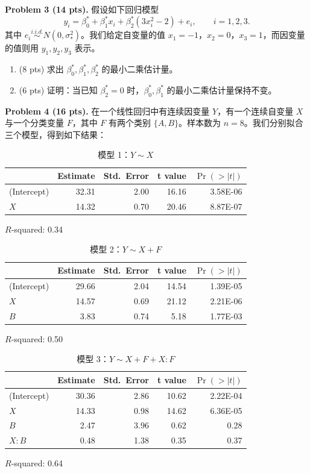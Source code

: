 \documentclass[11pt]{ctexart}
\begin{document}
\noindent\textbf{Problem 3 (14 pts).} 假设如下回归模型
\[
y_i = \beta_0^* + \beta_1^* x_i + \beta_2^* \left(3x_i^2 - 2\right) + e_i, \qquad i = 1, 2, 3.
\]
其中 $e_i \stackrel{i.i.d.}{\sim} N(0, \sigma_*^2)$。我们给定自变量的值 $x_1 = -1$，$x_2 = 0$，$x_3 = 1$，而因变量的值则用 $y_1, y_2, y_3$ 表示。
\begin{enumerate}
\item (8 pts) 求出 $\beta_0^*, \beta_1^*, \beta_2^*$ 的最小二乘估计量。
\item (6 pts) 证明：当已知 $\beta_2^* = 0$ 时，$\beta_0^*, \beta_1^*$ 的最小二乘估计量保持不变。
\end{enumerate}

\noindent\textbf{Problem 4 (16 pts).} 在一个线性回归中有连续因变量 $Y$，有一个连续自变量 $X$ 与一个分类变量 $F$，其中 $F$ 有两个类别 $\{A, B\}$。样本数为 $n = 8$。我们分别拟合三个模型，得到如下结果：

\begin{table}[h]
\centering
\caption{模型 1：$Y \sim X$}
\begin{tabular}{lrrrr}
\toprule
 & Estimate & Std.\ Error & t value & $\Pr(>|t|)$ \\
\midrule
(Intercept) & 32.31 & 2.00 & 16.16 & 3.58E-06 \\
$X$ & 14.32 & 0.70 & 20.46 & 8.87E-07 \\
\bottomrule
\end{tabular}

\vspace{0.3em}
\centering $R$-squared: 0.34
\end{table}

\begin{table}[h]
\centering
\caption{模型 2：$Y \sim X + F$}
\begin{tabular}{lrrrr}
\toprule
 & Estimate & Std.\ Error & t value & $\Pr(>|t|)$ \\
\midrule
(Intercept) & 29.66 & 2.04 & 14.54 & 1.39E-05 \\
$X$ & 14.57 & 0.69 & 21.12 & 2.21E-06 \\
$B$ & 3.83 & 0.74 & 5.18 & 1.77E-03 \\
\bottomrule
\end{tabular}

\vspace{0.3em}
\centering $R$-squared: 0.50
\end{table}

\begin{table}[h]
\centering
\caption{模型 3：$Y \sim X + F + X : F$}
\begin{tabular}{lrrrr}
\toprule
 & Estimate & Std.\ Error & t value & $\Pr(>|t|)$ \\
\midrule
(Intercept) & 30.36 & 2.86 & 10.62 & 2.22E-04 \\
$X$ & 14.33 & 0.98 & 14.62 & 6.36E-05 \\
$B$ & 2.47 & 3.96 & 0.62 & 0.28 \\
$X : B$ & 0.48 & 1.38 & 0.35 & 0.37 \\
\bottomrule
\end{tabular}

\vspace{0.3em}
\centering $R$-squared: 0.64
\end{table}
\end{document}
